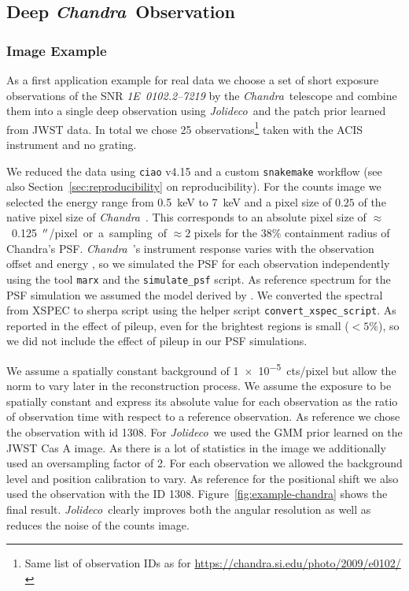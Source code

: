 \documentclass[twocolumn]{aastex631}
\newcommand{\chandra}{\textit{Chandra}~}
\newcommand{\jolideco}{\textit{Jolideco}~}
\begin{document}
    \subsection{Deep \chandra Observation}
    \subsubsection{Image Example}
    As a first application example for real data we choose a set of short exposure observations of the SNR \textit{1E~0102.2–7219} by the \chandra telescope and combine them into a single deep observation using \jolideco and the patch prior learned from JWST data. In total we chose 25 observations\footnote{Same list of observation IDs as for \url{https://chandra.si.edu/photo/2009/e0102/}} taken with  the ACIS instrument and no grating. 
    
    We reduced the data using \texttt{ciao} v4.15 and a custom \texttt{snakemake} workflow (see also Section~\ref{sec:reproducibility} on reproducibility). For the counts image we selected the energy range from \qty[mode = text]{0.5}{keV} to  \qty[mode = text]{7}{keV} and a pixel size of $0.25$ of the native pixel size of \chandra. This corresponds to an absolute  pixel size of $\approx$~\qty[mode = text]{0.125}{$\mbox{$^{\prime\prime}$}$/pixel} or a sampling of $\approx2$ pixels for the $38\%$ containment radius of Chandra's PSF. \chandra's instrument response varies with the observation offset and energy \citep{ChandraPOG2022}, so we simulated the PSF for each observation independently using the tool \texttt{marx} \citep{Davis2012} and the \texttt{simulate\_psf} script. As reference spectrum for the PSF simulation we assumed the model derived by \cite{Plucinsky2017}. We converted the spectral from XSPEC to sherpa script using the helper script \texttt{convert\_xspec\_script}. As reported in \cite{Xi2019} the effect of pileup, even for the brightest regions is small ($<5\%$), so we did not include the effect of pileup in our PSF simulations. 

    We assume a spatially constant background of \qty[mode = text]{1e-5}{cts/pixel} but allow the norm to vary later in the reconstruction process. We assume the exposure to be spatially constant and express its absolute value for each observation as the ratio of observation time with respect to a reference observation. As reference we chose the observation with id 1308. For \jolideco we used the GMM prior learned on the JWST Cas A image. As there is a lot of statistics in the image we additionally used an oversampling factor of 2. For each observation we allowed the background level and position calibration to vary. As reference for the positional shift we also used the observation with the ID 1308. Figure~\ref{fig:example-chandra} shows the final result. \jolideco clearly improves both the angular resolution as well as reduces the noise of the counts image. 
\end{document}
